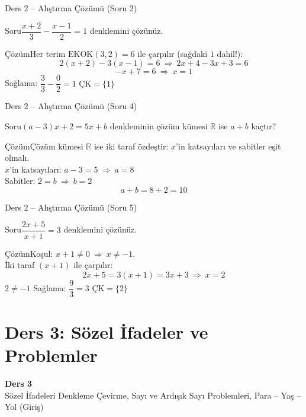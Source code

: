 \documentclass[aspectratio=169,11pt]{beamer}
\newcommand{\soru}[3]{%
\begin{frame}{#1}
  \begin{block}{Soru}\large #2\end{block}
  \pause
  \begin{exampleblock}{Çözüm}\large #3\end{exampleblock}
\end{frame}}
\begin{document}
\soru{Ders 2 -- Alıştırma Çözümü (Soru 2)}
{\(\dfrac{x+2}{3}-\dfrac{x-1}{2}=1\) denklemini çözünüz.}
{Her terim \(\text{EKOK}(3,2)=6\) ile çarpılır (sağdaki \(1\) dahil!):
\[2(x+2)-3(x-1)=6\ \Rightarrow\ 2x+4-3x+3=6\]
\[-x+7=6\ \Rightarrow\ x=1\]
Sağlama: \(\dfrac{3}{3}-\dfrac{0}{2}=1\) \checkmark \qquad \(\text{ÇK}=\{1\}\)}

\soru{Ders 2 -- Alıştırma Çözümü (Soru 4)}
{\((a-3)x+2=5x+b\) denkleminin çözüm kümesi \(\mathbb{R}\) ise \(a+b\) kaçtır?}
{Çözüm kümesi \(\mathbb{R}\) ise iki taraf özdeştir: \(x\)'in katsayıları ve sabitler eşit olmalı.\\[3pt]
\(x\)'in katsayıları: \(a-3=5\ \Rightarrow\ a=8\)\\[3pt]
Sabitler: \(2=b\ \Rightarrow\ b=2\)
\[a+b=8+2=10\]}

\soru{Ders 2 -- Alıştırma Çözümü (Soru 5)}
{\(\dfrac{2x+5}{x+1}=3\) denklemini çözünüz.}
{Koşul: \(x+1\neq 0\ \Rightarrow\ x\neq -1\).\\[3pt]
İki taraf \((x+1)\) ile çarpılır:
\[2x+5=3(x+1)=3x+3\ \Rightarrow\ x=2\]
\(2\neq-1\) \checkmark \quad Sağlama: \(\dfrac{9}{3}=3\) \checkmark \qquad \(\text{ÇK}=\{2\}\)}

\section{Ders 3: Sözel İfadeler ve Problemler}
\begin{frame}
\centering\Large\color{anamavi}\textbf{Ders 3}\\[6pt]\normalsize Sözel İfadeleri Denkleme Çevirme, Sayı ve Ardışık Sayı Problemleri, Para -- Yaş -- Yol (Giriş)
\end{frame}
\end{document}

